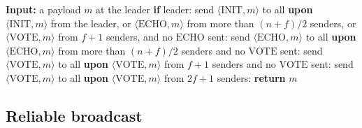 \begin{algorithm}
    \caption{Reliable broadcast, Algorithm~1 of~\cite{AFW25}, from
      Bracha \cite{Bra87}.
      Algorithm~6 of the source blueprint~\cite{LeslieBP} fires the echo
      step on a received $\mathrm{INIT}$ message alone and puts $n-f$ at every
      quorum (D34).}
    \label{alg:brb}
    \begin{algorithmic}
        \State \textbf{Input:} a payload $m$ at the leader
        \medskip
        \State \textbf{if} leader: send $\langle \mathrm{INIT}, m \rangle$ to all
        \State \textbf{upon} $\langle \mathrm{INIT}, m \rangle$ from the
          leader, or $\langle \mathrm{ECHO}, m \rangle$ from more than
          $(n+f)/2$ senders, or $\langle \mathrm{VOTE}, m \rangle$ from
          $f + 1$ senders, and no $\mathrm{ECHO}$ sent: send $\langle \mathrm{ECHO}, m \rangle$ to all
        \State \textbf{upon} $\langle \mathrm{ECHO}, m \rangle$ from more than
          $(n+f)/2$ senders and no $\mathrm{VOTE}$ sent: send $\langle \mathrm{VOTE}, m \rangle$ to all
        \State \textbf{upon} $\langle \mathrm{VOTE}, m \rangle$ from $f + 1$
          senders and no $\mathrm{VOTE}$ sent: send $\langle \mathrm{VOTE}, m \rangle$ to all
        \State \textbf{upon} $\langle \mathrm{VOTE}, m \rangle$ from $2f + 1$
          senders: \textbf{return} $m$
    \end{algorithmic}
\end{algorithm}


\subsection{Reliable broadcast}


